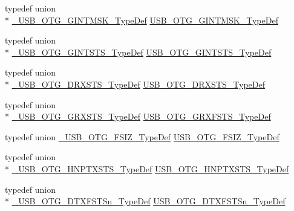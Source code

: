 \begin{DoxyCompactItemize}
\item 
typedef union \\*
\hyperlink{union___u_s_b___o_t_g___g_i_n_t_m_s_k___type_def}{\-\_\-\-U\-S\-B\-\_\-\-O\-T\-G\-\_\-\-G\-I\-N\-T\-M\-S\-K\-\_\-\-Type\-Def} \hyperlink{group______otg___core__registers_gacfc480525291213a55a804d42663e02c}{U\-S\-B\-\_\-\-O\-T\-G\-\_\-\-G\-I\-N\-T\-M\-S\-K\-\_\-\-Type\-Def}
\item 
typedef union \\*
\hyperlink{union___u_s_b___o_t_g___g_i_n_t_s_t_s___type_def}{\-\_\-\-U\-S\-B\-\_\-\-O\-T\-G\-\_\-\-G\-I\-N\-T\-S\-T\-S\-\_\-\-Type\-Def} \hyperlink{group______otg___core__registers_ga70644d144e3a07bed3b0720e6e984494}{U\-S\-B\-\_\-\-O\-T\-G\-\_\-\-G\-I\-N\-T\-S\-T\-S\-\_\-\-Type\-Def}
\item 
typedef union \\*
\hyperlink{union___u_s_b___o_t_g___d_r_x_s_t_s___type_def}{\-\_\-\-U\-S\-B\-\_\-\-O\-T\-G\-\_\-\-D\-R\-X\-S\-T\-S\-\_\-\-Type\-Def} \hyperlink{group______otg___core__registers_ga270595a11af3ba26b0dbc5523985594c}{U\-S\-B\-\_\-\-O\-T\-G\-\_\-\-D\-R\-X\-S\-T\-S\-\_\-\-Type\-Def}
\item 
typedef union \\*
\hyperlink{union___u_s_b___o_t_g___g_r_x_s_t_s___type_def}{\-\_\-\-U\-S\-B\-\_\-\-O\-T\-G\-\_\-\-G\-R\-X\-S\-T\-S\-\_\-\-Type\-Def} \hyperlink{group______otg___core__registers_ga36e920d2e0b78286d914d5f804d5e960}{U\-S\-B\-\_\-\-O\-T\-G\-\_\-\-G\-R\-X\-F\-S\-T\-S\-\_\-\-Type\-Def}
\item 
typedef union \hyperlink{union___u_s_b___o_t_g___f_s_i_z___type_def}{\-\_\-\-U\-S\-B\-\_\-\-O\-T\-G\-\_\-\-F\-S\-I\-Z\-\_\-\-Type\-Def} \hyperlink{group______otg___core__registers_ga2ab19ea3a65f1f78327102a3171ac144}{U\-S\-B\-\_\-\-O\-T\-G\-\_\-\-F\-S\-I\-Z\-\_\-\-Type\-Def}
\item 
typedef union \\*
\hyperlink{union___u_s_b___o_t_g___h_n_p_t_x_s_t_s___type_def}{\-\_\-\-U\-S\-B\-\_\-\-O\-T\-G\-\_\-\-H\-N\-P\-T\-X\-S\-T\-S\-\_\-\-Type\-Def} \hyperlink{group______otg___core__registers_gac67caaa3f13591c01b41da06f8ff50b2}{U\-S\-B\-\_\-\-O\-T\-G\-\_\-\-H\-N\-P\-T\-X\-S\-T\-S\-\_\-\-Type\-Def}
\item 
typedef union \\*
\hyperlink{union___u_s_b___o_t_g___d_t_x_f_s_t_sn___type_def}{\-\_\-\-U\-S\-B\-\_\-\-O\-T\-G\-\_\-\-D\-T\-X\-F\-S\-T\-Sn\-\_\-\-Type\-Def} \hyperlink{group______otg___core__registers_ga4dfd2c80097ffad3132ab084bab8f0fd}{U\-S\-B\-\_\-\-O\-T\-G\-\_\-\-D\-T\-X\-F\-S\-T\-Sn\-\_\-\-Type\-Def}

\end{DoxyCompactItemize}
